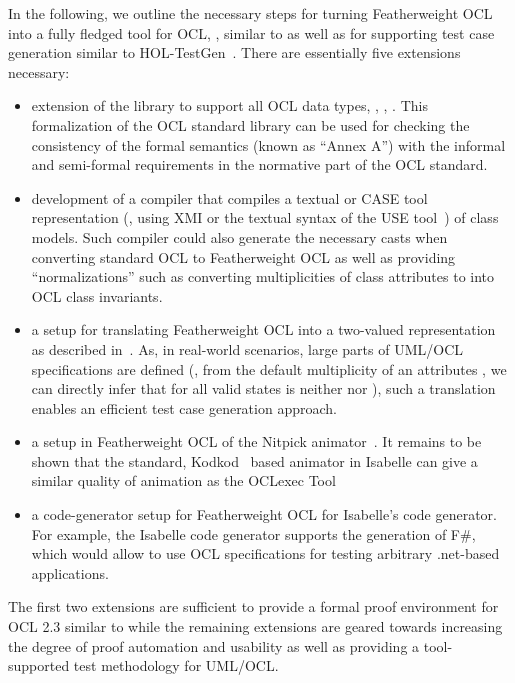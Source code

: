 In the following, we outline the necessary steps for turning
Featherweight OCL into a fully fledged tool for OCL, \eg, similar to
\holocl as well as for supporting test case generation similar to
{HOL}-TestGen~\cite{brucker.ea:hol-testgen:2009}.  There are
essentially five extensions necessary:
\begin{itemize}
\item extension of  the library to support all OCL data types, \eg,
  , . %
  This formalization of the OCL standard library can be used for
  checking the consistency of the formal semantics (known as ``Annex
  A'') with the informal and semi-formal requirements in the normative
  part of the OCL standard.
\item development of a compiler that compiles a textual or CASE
  tool representation (\eg, using XMI or the textual syntax of
  the USE tool~\cite{richters:precise:2002}) of class
  models. Such compiler could also generate the necessary casts when
  converting standard OCL to Featherweight OCL as well as providing
  ``normalizations'' such as converting multiplicities of class
  attributes to into OCL class invariants.
\item a setup for translating Featherweight OCL into a two-valued
  representation as described
  in~\cite{brucker.ea:ocl-testing:2010}. As, in real-world scenarios,
  large parts of {UML}/{OCL} specifications are defined (\eg,
  from the default multiplicity  of an attributes
  , we can directly infer that for all valid states
   is neither  nor ),
  such a translation enables an efficient test case generation
  approach.
\item a setup in Featherweight OCL of the Nitpick
  animator~\cite{blanchette.ea:nitpick:2010}. It remains to be shown
  that the standard, Kodkod~\cite{torlak.ea:kodkod:2007} based
  animator in Isabelle can give a similar quality of animation as the
  OCLexec Tool~\cite{krieger.ea:generative:2010}
\item a code-generator setup for Featherweight OCL for Isabelle's
  code generator. For example, the Isabelle code generator supports
  the generation of F\#, which would allow to use {OCL}
  specifications for testing arbitrary .net-based applications.
\end{itemize}
The first two extensions are sufficient to provide a formal proof
environment for OCL 2.3 similar to \holocl while the remaining
extensions are geared towards increasing the degree of proof
automation and usability as well as providing a tool-supported test
methodology for {UML}/{OCL}.


